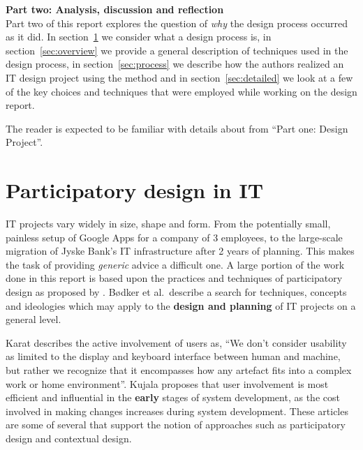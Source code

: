 \setcounter{section}{0}
\setcounter{figure}{0}
\setcounter{table}{0}
\newpage
\textbf{\LARGE{{Part two: Analysis, discussion and reflection}}}\\

Part two of this report explores the question of \textit{why}
the design process occurred as it did. In section~\ref{sec:participatory}
we consider what a design process is, in section~\ref{sec:overview}
we provide a general description of techniques used in the design process,
in section~\ref{sec:process} we describe how the authors realized an IT design
project using the \must{} method and in section~\ref{sec:detailed} we
look at a few of the key choices and techniques that were employed while working
on the design report.

The reader is expected to be familiar with details about \gomonkey{} 
from ``Part one: Design Project''.

\section{Participatory design in IT} \label{sec:participatory}
IT projects vary widely in size, shape and form. From the potentially small,
painless setup of Google Apps for a company of 3 employees, to the large-scale
migration of Jyske Bank's IT infrastructure after 2 years of
planning\cite{jyskebank}. This makes the task of providing \textit{generic}
advice a difficult one. A large portion of the work done in this report is based
upon the practices and techniques of participatory design as proposed by
\cite{bodker2004participatory}.  B\o dker et al.\ describe a search for
techniques, concepts and ideologies which may apply to the \textbf{design and
planning} of IT projects on a general level. 

Karat\cite{karat1997evolving} describes the active involvement of users as, ``We don't consider
usability as limited to the display and keyboard interface between human and machine, but rather
we recognize that it encompasses how any artefact fits into a complex work or home environment''.
Kujala\cite{kujala2003user} proposes that user involvement is most efficient and influential in the 
\textbf{early} stages of system development, as the cost involved in making changes increases during 
system development. These articles are some of several that support the notion of approaches such as 
participatory design\cite{bodker2004participatory} and contextual design\cite{beyer1997contextual}.

